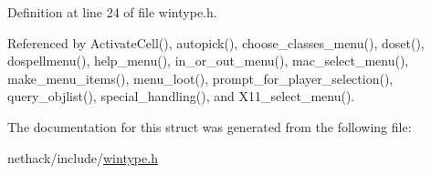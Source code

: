 Definition at line 24 of file wintype.\+h.



Referenced by Activate\+Cell(), autopick(), choose\+\_\+classes\+\_\+menu(), doset(), dospellmenu(), help\+\_\+menu(), in\+\_\+or\+\_\+out\+\_\+menu(), mac\+\_\+select\+\_\+menu(), make\+\_\+menu\+\_\+items(), menu\+\_\+loot(), prompt\+\_\+for\+\_\+player\+\_\+selection(), query\+\_\+objlist(), special\+\_\+handling(), and X11\+\_\+select\+\_\+menu().



The documentation for this struct was generated from the following file\+:\begin{DoxyCompactItemize}
\item 
nethack/include/\hyperlink{wintype_8h}{wintype.\+h}\end{DoxyCompactItemize}
